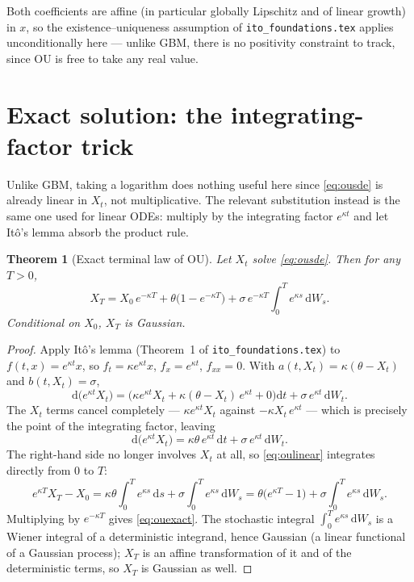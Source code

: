 \documentclass[11pt]{article}
\newcommand{\dd}{\mathrm{d}}
\newcommand{\dW}{\dd W_t}
\newcommand{\dt}{\dd t}
\newcommand{\drift}{a}
\newcommand{\diff}{b}
\theoremstyle{plain}
\newtheorem{theorem}{Theorem}
\theoremstyle{definition}
\theoremstyle{remark}
\begin{document}
Both coefficients are affine (in particular globally Lipschitz and of
linear growth) in $x$, so the existence--uniqueness assumption of
\texttt{ito\_foundations.tex} applies unconditionally here --- unlike
GBM, there is no positivity constraint to track, since OU is free to
take any real value.

\section{Exact solution: the integrating-factor trick}

Unlike GBM, taking a logarithm does nothing useful here since
\eqref{eq:ousde} is already linear in $X_t$, not multiplicative. The
relevant substitution instead is the same one used for linear ODEs:
multiply by the integrating factor $e^{\kappa t}$ and let It\^o's
lemma absorb the product rule.

\begin{theorem}[Exact terminal law of OU]\label{thm:ou-exact}
Let $X_t$ solve \eqref{eq:ousde}. Then for any $T>0$,
\begin{equation}\label{eq:ouexact}
   X_T = X_0\,e^{-\kappa T} + \theta\big(1-e^{-\kappa T}\big)
         + \sigma\, e^{-\kappa T}\!\int_0^T e^{\kappa s}\,\dd W_s .
\end{equation}
Conditional on $X_0$, $X_T$ is Gaussian.
\end{theorem}

\begin{proof}
Apply It\^o's lemma (Theorem~1 of \texttt{ito\_foundations.tex}) to
$f(t,x)=e^{\kappa t}x$, so $f_t=\kappa e^{\kappa t}x$, $f_x=e^{\kappa
t}$, $f_{xx}=0$. With $\drift(t,X_t)=\kappa(\theta-X_t)$ and
$\diff(t,X_t)=\sigma$,
\[
   \dd\big(e^{\kappa t}X_t\big)
     = \Big(\kappa e^{\kappa t}X_t + \kappa(\theta-X_t)\,e^{\kappa t}
             + 0\Big)\dt + \sigma\,e^{\kappa t}\,\dW .
\]
The $X_t$ terms cancel completely --- $\kappa e^{\kappa t}X_t$ against
$-\kappa X_t\,e^{\kappa t}$ --- which is precisely the point of the
integrating factor, leaving
\begin{equation}\label{eq:oulinear}
   \dd\big(e^{\kappa t}X_t\big) = \kappa\theta\,e^{\kappa t}\,\dt
                                   + \sigma\,e^{\kappa t}\,\dW .
\end{equation}
The right-hand side no longer involves $X_t$ at all, so
\eqref{eq:oulinear} integrates directly from $0$ to $T$:
\[
   e^{\kappa T}X_T - X_0
     = \kappa\theta\int_0^T e^{\kappa s}\,\dd s
       + \sigma\int_0^T e^{\kappa s}\,\dd W_s
     = \theta\big(e^{\kappa T}-1\big)
       + \sigma\int_0^T e^{\kappa s}\,\dd W_s .
\]
Multiplying by $e^{-\kappa T}$ gives \eqref{eq:ouexact}. The stochastic
integral $\int_0^T e^{\kappa s}\,\dd W_s$ is a Wiener integral of a
deterministic integrand, hence Gaussian (a linear functional of a
Gaussian process); $X_T$ is an affine transformation of it and of the
deterministic terms, so $X_T$ is Gaussian as well.
\end{proof}
\end{document}
